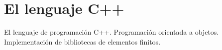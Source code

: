 
\section{El lenguaje C++}

\begin{contenidos}
  El lenguaje de programación C++. Programación orientada a
  objetos. Implementación de bibliotecas de elementos finitos.
\end{contenidos}



